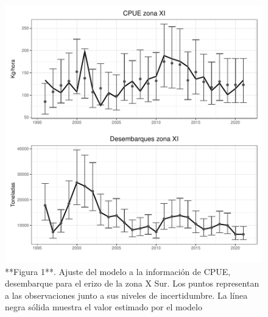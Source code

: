 \documentclass[
]{article}
\begin{document}
\begin{figure}

{\centering \includegraphics{Figuras/Fig_ajustesIndices_XI-1} 

}

\caption{**Figura 1**. Ajuste del modelo a la información de CPUE, desembarque para el erizo de la zona X Sur. Los puntos representan a las observaciones junto a sus niveles de incertidumbre. La línea negra sólida muestra el valor estimado por el modelo}\label{fig:Fig_ajustesIndices_XI}
\end{figure}
\end{document}
